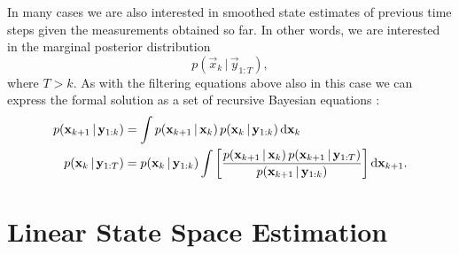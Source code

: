 In many cases we are also interested in smoothed state estimates of
previous time steps given the measurements obtained so far. In other
words, we are interested in the marginal posterior distribution
%
\begin{equation} p(\vec{x}_{k}\,|\,\vec{y}_{1:T}),
\end{equation}
%
where $T > k$. As with the filtering equations above also in this case
we can express the formal solution as a set of recursive Bayesian
equations \citep[e.g.][]{Sarkka+Vehtari+Lampinen:2007}:
%
\begin{equation}
\begin{split} p(\mathbf{x}_{k+1}\,|\,\mathbf{y}_{1:k}) &= \int
p(\mathbf{x}_{k+1}\,|\,\mathbf{x}_k) \, p(\mathbf{x}_k\,|\,\mathbf{y}_{1:k}) \,
\mathrm{d}\mathbf{x}_k \\ p(\mathbf{x}_k\,|\,\mathbf{y}_{1:T}) &=
p(\mathbf{x}_k\,|\,\mathbf{y}_{1:k}) \int \left[
\frac{p(\mathbf{x}_{k+1}\,|\,\mathbf{x}_k) \,
p(\mathbf{x}_{k+1}\,|\,\mathbf{y}_{1:T})}
{p(\mathbf{x}_{k+1}\,|\,\mathbf{y}_{1:k})} \right] \mathrm{d} \mathbf{x}_{k+1}.
\end{split}
\end{equation}
%






%
\section{Linear State Space Estimation}
%


